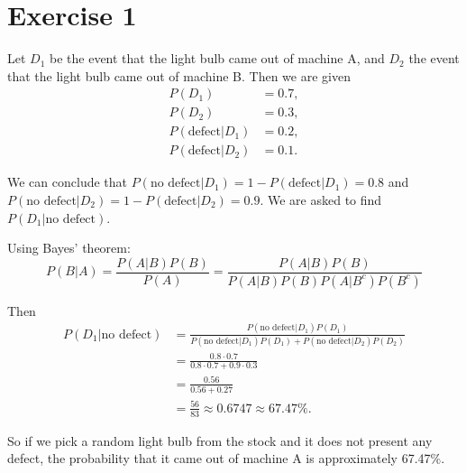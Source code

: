 \section{Exercise 1}

Let $D_1$ be the event that the light bulb came out of machine A, and $D_2$ the event that the light bulb came out of machine B. Then we are given
\begin{align*}
	P(D_1)                 & = 0.7, \\
	P(D_2)                 & = 0.3, \\
	P(\text{defect} | D_1) & = 0.2, \\
	P(\text{defect} | D_2) & = 0.1.
\end{align*}

We can conclude that $P(\text{no defect} | D_1) = 1 - P(\text{defect} | D_1) = 0.8$ and $P(\text{no defect} | D_2) = 1 - P(\text{defect} | D_2) = 0.9$. We are asked to find $P(D_1 | \text{no defect})$.

Using Bayes' theorem:
\[
	P(B | A) = \frac{P(A | B) P(B)}{P(A)} = \frac{P(A|B)P(B)}{P(A|B)P(B)P(A|B^c)P(B^c)}
\]

Then
\begin{align*}
	P(D_1 | \text{no defect}) & = \frac{P(\text{no defect} | D_1) P(D_1)}{P(\text{no defect} | D_1) P(D_1) + P(\text{no defect} | D_2) P(D_2)} \\
	                          & = \frac{0.8\cdot 0.7}{0.8\cdot 0.7 + 0.9\cdot 0.3}                                                             \\
	                          & = \frac{0.56}{0.56 + 0.27}                                                                                     \\
	                          & = \frac{56}{83} \approx 0.6747\approx 67.47\%.
\end{align*}

So if we pick a random light bulb from the stock and it does not present any defect, the probability that it came out of machine A is approximately 67.47\%.
